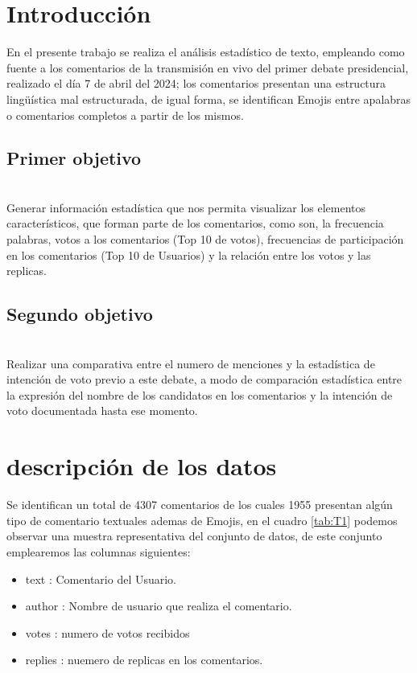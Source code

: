 \chapter{Introducción}

En el presente trabajo se realiza el análisis estadístico de texto, empleando como fuente a los comentarios de la transmisión en vivo del primer debate presidencial, realizado el día 7 de abril del 2024; los comentarios presentan una estructura lingüística mal estructurada, de igual forma, se identifican Emojis entre apalabras o comentarios completos a partir de los mismos.\\


\section{Primer objetivo}\\
 Generar información estadística que nos permita visualizar los elementos característicos, que forman parte de los comentarios, como son, la frecuencia palabras, votos a los comentarios (Top 10 de votos), frecuencias de participación en los comentarios (Top 10 de Usuarios) y la relación entre los votos y las replicas.\\

\section{Segundo objetivo}\\
 Realizar una comparativa entre el numero de menciones y la estadística de intención de voto previo a este debate, a modo de comparación estadística entre la expresión del nombre de los candidatos en los comentarios y la intención de voto documentada hasta ese momento.\\
   


\chapter{descripción de los datos}


Se identifican un total de 4307 comentarios de los cuales 1955 presentan algún tipo de comentario textuales ademas de Emojis, en el cuadro \ref{tab:T1} podemos observar una muestra representativa del conjunto de datos, de este conjunto emplearemos las columnas siguientes:\\

\begin{itemize}
	\item text : Comentario del Usuario.
	\item author : Nombre de usuario que realiza el comentario.
	\item votes : numero de votos recibidos 
	\item replies : nuemero de replicas en los comentarios.
\end{itemize} 


